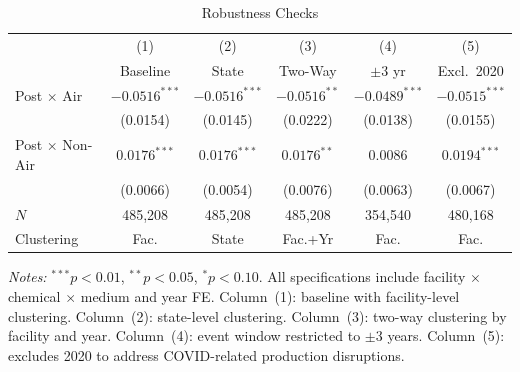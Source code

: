 \begin{table}[t]
\centering
\caption{Robustness Checks}
\label{tab:robust}
\small
\begin{tabular}{lccccc}
\hline\hline
& (1) & (2) & (3) & (4) & (5) \\
& Baseline & State & Two-Way & $\pm 3$ yr & Excl.~2020 \\
\hline
Post $\times$ Air & $-0.0516^{***}$ & $-0.0516^{***}$ & $-0.0516^{**}$ & $-0.0489^{***}$ & $-0.0515^{***}$ \\
& (0.0154) & (0.0145) & (0.0222) & (0.0138) & (0.0155) \\[4pt]
Post $\times$ Non-Air & $0.0176^{***}$ & $0.0176^{***}$ & $0.0176^{**}$ & $0.0086$ & $0.0194^{***}$ \\
& (0.0066) & (0.0054) & (0.0076) & (0.0063) & (0.0067) \\
\hline
$N$ & 485,208 & 485,208 & 485,208 & 354,540 & 480,168 \\
Clustering & Fac. & State & Fac.+Yr & Fac. & Fac. \\
\hline\hline
\end{tabular}
\vspace{0.3em}
\begin{minipage}{\textwidth}
\footnotesize
\textit{Notes:} $^{***}p<0.01$, $^{**}p<0.05$, $^{*}p<0.10$. All specifications include facility $\times$ chemical $\times$ medium and year FE. Column~(1): baseline with facility-level clustering. Column~(2): state-level clustering. Column~(3): two-way clustering by facility and year. Column~(4): event window restricted to $\pm 3$ years. Column~(5): excludes 2020 to address COVID-related production disruptions.
\end{minipage}
\end{table}
